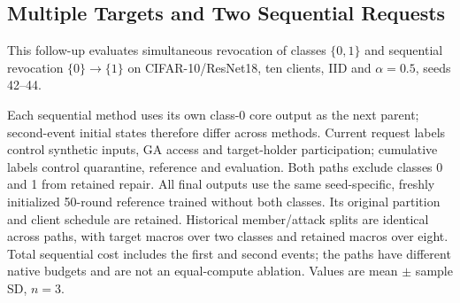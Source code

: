 \subsection{Multiple Targets and Two Sequential Requests}

\label{sec:sequence}

This follow-up evaluates simultaneous revocation of classes $\{0,1\}$ and sequential revocation $\{0\}\rightarrow\{1\}$ on CIFAR-10/ResNet18, ten clients, IID and $\alpha=0.5$, seeds 42--44. 

Each sequential method uses its own class-0 core output as the next parent; second-event initial states therefore differ across methods. Current request labels control synthetic inputs, GA access and target-holder participation; cumulative labels control quarantine, reference and evaluation. Both paths exclude classes 0 and 1 from retained repair. All final outputs use the same seed-specific, freshly initialized 50-round reference trained without both classes. Its original partition and client schedule are retained. Historical member/attack splits are identical across paths, with target macros over two classes and retained macros over eight. Total sequential cost includes the first and second events; the paths have different native budgets and are not an equal-compute ablation. Values are mean $\pm$ sample SD, $n=3$.

